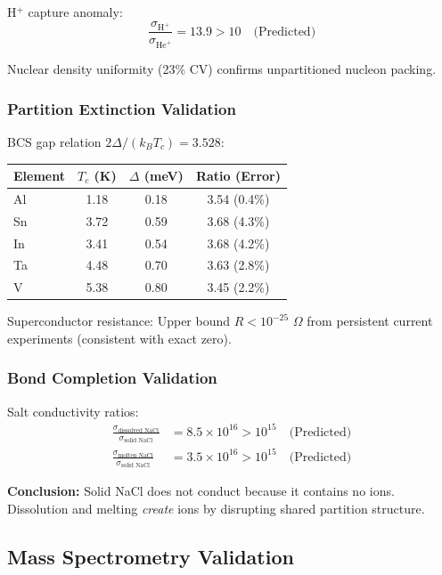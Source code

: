 \documentclass[twocolumn,10pt,a4paper]{article}
\theoremstyle{definition}
\theoremstyle{remark}
\begin{document}
H$^+$ capture anomaly:
\begin{equation}
    \frac{\sigma_{\text{H}^+}}{\sigma_{\text{He}^+}} = 13.9 > 10 \quad \text{(Predicted)}
\end{equation}

Nuclear density uniformity (23\% CV) confirms unpartitioned nucleon packing.

\subsubsection{Partition Extinction Validation}

BCS gap relation $2\Delta/(k_B T_c) = 3.528$:

\begin{center}
\begin{tabular}{lccc}
\toprule
Element & $T_c$ (K) & $\Delta$ (meV) & Ratio (Error) \\
\midrule
Al & 1.18 & 0.18 & 3.54 (0.4\%) \\
Sn & 3.72 & 0.59 & 3.68 (4.3\%) \\
In & 3.41 & 0.54 & 3.68 (4.2\%) \\
Ta & 4.48 & 0.70 & 3.63 (2.8\%) \\
V & 5.38 & 0.80 & 3.45 (2.2\%) \\
\bottomrule
\end{tabular}
\end{center}

Superconductor resistance: Upper bound $R < 10^{-25}$ $\Omega$ from persistent current experiments (consistent with exact zero).

\subsubsection{Bond Completion Validation}

Salt conductivity ratios:
\begin{align}
    \frac{\sigma_{\text{dissolved NaCl}}}{\sigma_{\text{solid NaCl}}} &= 8.5 \times 10^{16} > 10^{15} \quad \text{(Predicted)} \\
    \frac{\sigma_{\text{molten NaCl}}}{\sigma_{\text{solid NaCl}}} &= 3.5 \times 10^{16} > 10^{15} \quad \text{(Predicted)}
\end{align}

\textbf{Conclusion:} Solid NaCl does not conduct because it contains no ions. Dissolution and melting \emph{create} ions by disrupting shared partition structure.

\subsection{Mass Spectrometry Validation}
\end{document}
